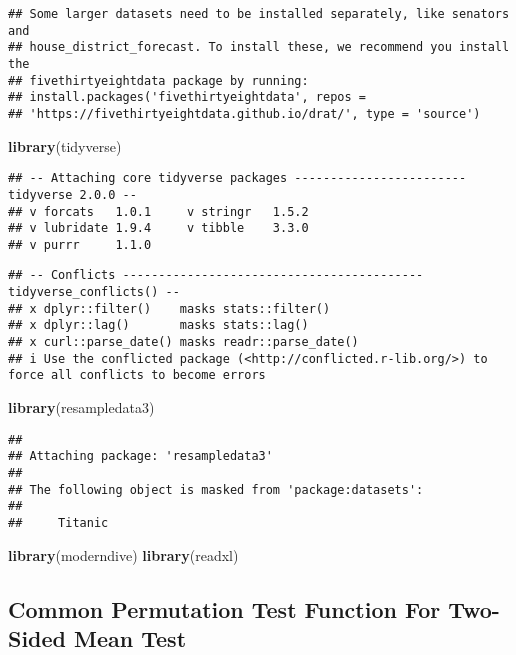 \documentclass[
]{article}
\newenvironment{Shaded}{\begin{snugshade}}{\end{snugshade}}
\newcommand{\FunctionTok}[1]{\textcolor[rgb]{0.13,0.29,0.53}{\textbf{#1}}}
\newcommand{\NormalTok}[1]{#1}
\begin{document}
\begin{verbatim}
## Some larger datasets need to be installed separately, like senators and
## house_district_forecast. To install these, we recommend you install the
## fivethirtyeightdata package by running:
## install.packages('fivethirtyeightdata', repos =
## 'https://fivethirtyeightdata.github.io/drat/', type = 'source')
\end{verbatim}

\begin{Shaded}
\begin{Highlighting}[]
\FunctionTok{library}\NormalTok{(tidyverse)}
\end{Highlighting}
\end{Shaded}

\begin{verbatim}
## -- Attaching core tidyverse packages ------------------------ tidyverse 2.0.0 --
## v forcats   1.0.1     v stringr   1.5.2
## v lubridate 1.9.4     v tibble    3.3.0
## v purrr     1.1.0
\end{verbatim}

\begin{verbatim}
## -- Conflicts ------------------------------------------ tidyverse_conflicts() --
## x dplyr::filter()    masks stats::filter()
## x dplyr::lag()       masks stats::lag()
## x curl::parse_date() masks readr::parse_date()
## i Use the conflicted package (<http://conflicted.r-lib.org/>) to force all conflicts to become errors
\end{verbatim}

\begin{Shaded}
\begin{Highlighting}[]
\FunctionTok{library}\NormalTok{(resampledata3)}
\end{Highlighting}
\end{Shaded}

\begin{verbatim}
## 
## Attaching package: 'resampledata3'
## 
## The following object is masked from 'package:datasets':
## 
##     Titanic
\end{verbatim}

\begin{Shaded}
\begin{Highlighting}[]
\FunctionTok{library}\NormalTok{(moderndive)}
\FunctionTok{library}\NormalTok{(readxl)}
\end{Highlighting}
\end{Shaded}

\subsection{Common Permutation Test Function For Two-Sided Mean
Test}\label{common-permutation-test-function-for-two-sided-mean-test}
\end{document}
